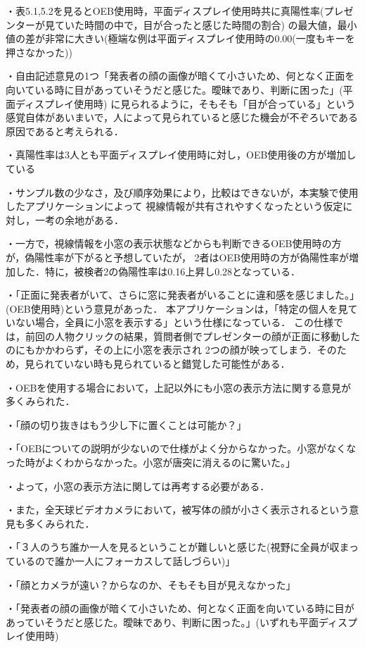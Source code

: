 ・表5.1,5.2を見るとOEB使用時，平面ディスプレイ使用時共に真陽性率(プレゼンターが見ていた時間の中で，目が合ったと感じた時間の割合)
の最大値，最小値の差が非常に大きい(極端な例は平面ディスプレイ使用時の0.00(一度もキーを押さなかった))

・自由記述意見の1つ「発表者の顔の画像が暗くて小さいため、何となく正面を向いている時に目があっていそうだと感じた。曖昧であり、判断に困った」(平面ディスプレイ使用時)
に見られるように，そもそも「目が合っている」という感覚自体があいまいで，人によって見られていると感じた機会が不ぞろいである原因であると考えられる．

・真陽性率は3人とも平面ディスプレイ使用時に対し，OEB使用後の方が増加している

・サンプル数の少なさ，及び順序効果により，比較はできないが，本実験で使用したアプリケーションによって
視線情報が共有されやすくなったという仮定に対し，一考の余地がある．

・一方で，視線情報を小窓の表示状態などからも判断できるOEB使用時の方が，偽陽性率が下がると予想していたが，
2者はOEB使用時の方が偽陽性率が増加した．特に，被検者2の偽陽性率は0.16上昇し0.28となっている．

・「正面に発表者がいて、さらに窓に発表者がいることに違和感を感じました。」(OEB使用時)という意見があった．
本アプリケーションは，「特定の個人を見ていない場合，全員に小窓を表示する」という仕様になっている．
この仕様では，前回の人物クリックの結果，質問者側でプレゼンターの顔が正面に移動したのにもかかわらず，その上に小窓を表示され
2つの顔が映ってしまう．そのため，見られていない時も見られていると錯覚した可能性がある．

・OEBを使用する場合において，上記以外にも小窓の表示方法に関する意見が多くみられた．

・「顔の切り抜きはもう少し下に置くことは可能か？」

・「OEBについての説明が少ないので仕様がよく分からなかった。小窓がなくなった時がよくわからなかった。小窓が唐突に消えるのに驚いた。」

・よって，小窓の表示方法に関しては再考する必要がある．

・また，全天球ビデオカメラにおいて，被写体の顔が小さく表示されるという意見も多くみられた．

・「３人のうち誰か一人を見るということが難しいと感じた(視野に全員が収まっているので誰か一人にフォーカスして話しづらい)」

・「顔とカメラが遠い？からなのか、そもそも目が見えなかった」

・「発表者の顔の画像が暗くて小さいため、何となく正面を向いている時に目があっていそうだと感じた。曖昧であり、判断に困った。」(いずれも平面ディスプレイ使用時)

